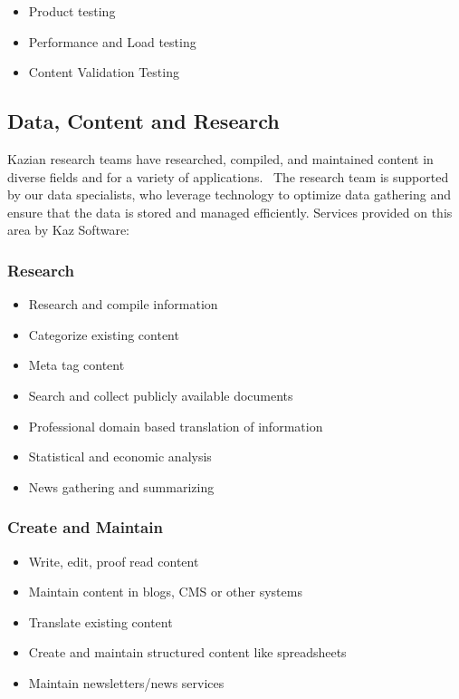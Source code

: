 \begin{itemize}
    \item Product testing
    \item Performance and Load testing
    \item Content Validation Testing
\end{itemize}

\subsection{Data, Content and Research}

Kazian research teams have researched, compiled, and maintained content in diverse fields and for a variety of applications. 
The research team is supported by our data specialists, who leverage technology to optimize data gathering and ensure that the data is stored and managed efficiently.
Services provided on this area by Kaz Software:

\subsubsection*{Research}

\begin{itemize}
    \item Research and compile information
    \item Categorize existing content
    \item Meta tag content
    \item Search and collect publicly available documents
    \item Professional domain based translation of information
    \item Statistical and economic analysis
    \item News gathering and summarizing
\end{itemize}

\subsubsection*{Create and Maintain}

\begin{itemize}
    \item Write, edit, proof read content
    \item Maintain content in blogs, CMS or other systems
    \item Translate existing content
    \item Create and maintain structured content like spreadsheets
    \item Maintain newsletters/news services
\end{itemize}

